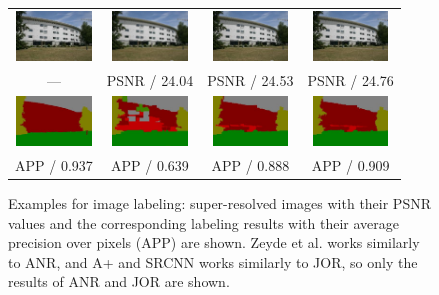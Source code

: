 \documentclass[10pt,twocolumn,letterpaper]{article}
\begin{document}
\begin{figure} [tb]
\begin{tabular*}{0.5\textwidth}{cccc}
\hspace{-2mm}
\includegraphics[width=2cm]{fig/3_22_s_o_lmnn_5_img.jpg} &\hspace{-4mm}
\includegraphics[width=2cm]{fig/3_22_s_B_lmnn_5_img.jpg} &\hspace{-4mm}
\includegraphics[width=2cm]{fig/3_22_s_A_lmnn_5_img.jpg} &\hspace{-4mm}
\includegraphics[width=2cm]{fig/3_22_s_J_lmnn_5_img.jpg} \\
 --- & PSNR / 24.04  & PSNR / 24.53  & PSNR / 24.76 \\   \hspace{-2mm}
\includegraphics[width=2cm]{fig/3_22_s_o_lmnn_5_label.jpg} &\hspace{-4mm}
\includegraphics[width=2cm]{fig/3_22_s_B_lmnn_5_label.jpg} &\hspace{-4mm}
\includegraphics[width=2cm]{fig/3_22_s_A_lmnn_5_label.jpg} &\hspace{-4mm}
\includegraphics[width=2cm]{fig/3_22_s_J_lmnn_5_label.jpg} \\
APP / 0.937 & APP / 0.639 & APP / 0.888 & APP / 0.909 \\
\end{tabular*}
   \caption{Examples for image labeling: super-resolved images with their PSNR values and the corresponding labeling results with their average precision over pixels (APP) are shown. Zeyde et al. works similarly to ANR, and A+ and SRCNN works similarly to JOR, so only  the results of ANR and JOR are shown.}
\label{fig:example:il}
\end{figure}
\end{document}
